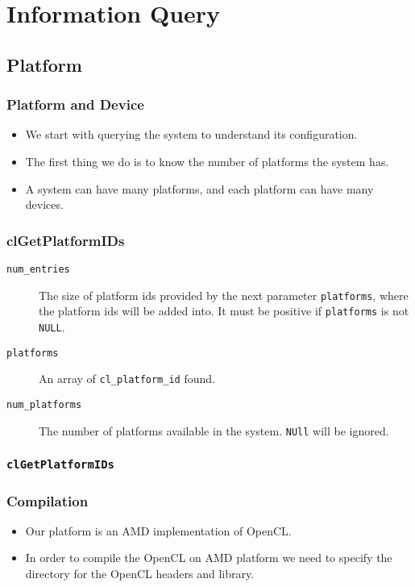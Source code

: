 \documentclass{beamer}
\begin{document}
\section{Information Query}

\subsection{Platform}

\begin{frame}
  \frametitle{Platform and Device}
  \begin{itemize}
  \item We start with querying the system to understand its
    configuration.
  \item The first thing we do is to know the number of platforms the
    system has.
  \item A system can have many platforms, and each platform can
    have many devices.
  \end{itemize}
\end{frame}

\begin{frame}
\end{frame}

\begin{frame}
  \frametitle{clGetPlatformIDs}
  \begin{description}
  \item [\tt num\_entries] The size of platform ids provided by the
    next parameter {\tt platforms}, where the platform ids will be
    added into.  It must be positive if {\tt platforms} is not {\tt
      NULL}.
  \item [\tt platforms] An array of {\tt cl\_platform\_id} found. 
  \item [\tt num\_platforms] The number of platforms available in the
    system.  {\tt NUll} will be ignored.
  \end{description}
\end{frame}

\begin{frame}
  \frametitle{\tt clGetPlatformIDs}
\end{frame}

\begin{frame}
  \frametitle{Compilation}
  \begin{itemize}
  \item Our platform is an AMD implementation of OpenCL.
  \item In order to compile the OpenCL on AMD platform we need to
    specify the directory for the OpenCL headers and library.
  \end{itemize}
\end{frame}
\end{document}
